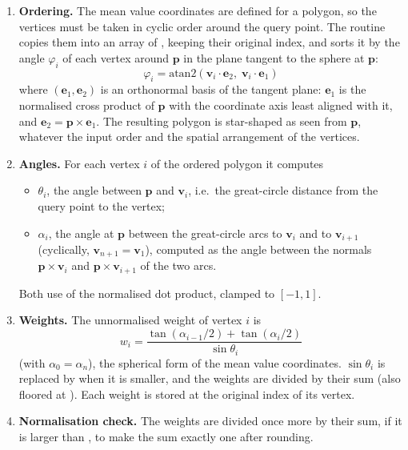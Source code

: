 \begin{enumerate}
  \item \textbf{Ordering.} The mean value coordinates are defined for a
        polygon, so the vertices must be taken in cyclic order around the
        query point. The routine copies them into an array of
        , keeping their original index, and sorts it by the
        angle $\varphi_i$ of each vertex around $\mathbf{p}$ in the plane
        tangent to the sphere at $\mathbf{p}$:
        \[
          \varphi_i = \text{atan2}(\mathbf{v}_i\cdot\mathbf{e}_2,\;
                                   \mathbf{v}_i\cdot\mathbf{e}_1)
        \]
        where $(\mathbf{e}_1, \mathbf{e}_2)$ is an orthonormal basis of
        the tangent plane: $\mathbf{e}_1$ is the normalised cross product
        of $\mathbf{p}$ with the coordinate axis least aligned with it, and
        $\mathbf{e}_2 = \mathbf{p}\times\mathbf{e}_1$. The resulting polygon
        is star-shaped as seen from $\mathbf{p}$, whatever the input order
        and the spatial arrangement of the vertices.
  \item \textbf{Angles.} For each vertex $i$ of the ordered polygon it
        computes
        \begin{itemize}
          \item $\theta_i$, the angle between $\mathbf{p}$ and
                $\mathbf{v}_i$, i.e.\ the great-circle distance from the
                query point to the vertex;
          \item $\alpha_i$, the angle at $\mathbf{p}$ between the
                great-circle arcs to $\mathbf{v}_i$ and to
                $\mathbf{v}_{i+1}$ (cyclically, $\mathbf{v}_{n+1} =
                \mathbf{v}_1$), computed as the angle between the normals
                $\mathbf{p}\times\mathbf{v}_i$ and
                $\mathbf{p}\times\mathbf{v}_{i+1}$ of the two arcs.
        \end{itemize}
        Both use  of the normalised dot product, clamped to
        $[-1, 1]$.
  \item \textbf{Weights.} The unnormalised weight of vertex $i$ is
        \[
          w_i = \frac{\tan(\alpha_{i-1}/2) + \tan(\alpha_i/2)}
                     {\sin\theta_i}
        \]
        (with $\alpha_0 = \alpha_n$), the spherical form of the mean value
        coordinates. $\sin\theta_i$ is replaced by  when it is
        smaller, and the weights are divided by their sum (also floored at
        ). Each weight is stored at the original index of its
        vertex.
  \item \textbf{Normalisation check.} The weights are divided once more
        by their sum, if it is larger than , to make the sum
        exactly one after rounding.
\end{enumerate}

